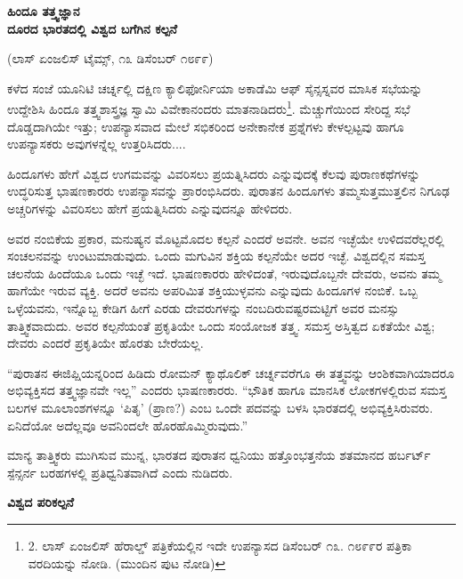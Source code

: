 \begin{center}
\textbf{ಹಿಂದೂ ತತ್ತ್ವಜ್ಞಾನ\\ದೂರದ ಭಾರತದಲ್ಲಿ ವಿಶ್ವದ ಬಗೆಗಿನ ಕಲ್ಪನೆ }
\end{center}

\begin{center}
(ಲಾಸ್ ಏಂಜಲಿಸ್ ಟೈಮ್ಸ್, ೧೩ ಡಿಸೆಂಬರ್ ೧೮೯೯)
\end{center}

ಕಳೆದ ಸಂಜೆ ಯೂನಿಟಿ ಚರ್ಚ್ನಲ್ಲಿ ದಕ್ಷಿಣ ಕ್ಯಾಲಿಫೋರ್ನಿಯಾ ಅಕಾಡೆಮಿ ಆಫ್ ಸೈನ್ಸಸ್ನವರ ಮಾಸಿಕ ಸಭೆಯನ್ನು ಉದ್ದೇಶಿಸಿ ಹಿಂದೂ ತತ್ತ್ವಶಾಸ್ತ್ರಜ್ಞ ಸ್ವಾಮಿ ವಿವೇಕಾನಂದರು ಮಾತನಾಡಿದರು\footnote{2. ಲಾಸ್ ಏಂಜಲಿಸ್ ಹೆರಾಲ್ಡ್ ಪತ್ರಿಕೆಯಲ್ಲಿನ ಇದೇ ಉಪನ್ಯಾಸದ ಡಿಸೆಂಬರ್ ೧೩. ೧೮೯೯ರ ಪತ್ರಿಕಾ ವರದಿಯನ್ನು ನೋಡಿ. (ಮುಂದಿನ ಪುಟ ನೋಡಿ)}. ಮೆಚ್ಚುಗೆಯಿಂದ ಸೇರಿದ್ದ ಸಭೆ ದೊಡ್ಡದಾಗಿಯೇ ಇತ್ತು; ಉಪನ್ಯಾಸವಾದ ಮೇಲೆ ಸಭಿಕರಿಂದ ಅನೇಕಾನೇಕ ಪ್ರಶ್ನೆಗಳು ಕೇಳಲ್ಪಟ್ಟವು ಹಾಗೂ ಉಪನ್ಯಾಸಕರು ಅವುಗಳನ್ನೆಲ್ಲ ಉತ್ತರಿಸಿದರು....

ಹಿಂದೂಗಳು ಹೇಗೆ ವಿಶ್ವದ ಉಗಮವನ್ನು ವಿವರಿಸಲು ಪ್ರಯತ್ನಿಸಿದರು ಎನ್ನುವುದಕ್ಕೆ ಕೆಲವು ಪುರಾಣಕಥೆಗಳನ್ನು ಉದ್ಧರಿಸುತ್ತ ಭಾಷಣಕಾರರು ಉಪನ್ಯಾಸವನ್ನು ಪ್ರಾರಂಭಿಸಿದರು. ಪುರಾತನ ಹಿಂದೂಗಳು ತಮ್ಮಸುತ್ತಮುತ್ತಲಿನ ನಿಗೂಢ ಅಚ್ಚರಿಗಳನ್ನು ವಿವರಿಸಲು ಹೇಗೆ ಪ್ರಯತ್ನಿಸಿದರು ಎನ್ನುವುದನ್ನೂ ಹೇಳಿದರು.

ಅವರ ನಂಬಿಕೆಯ ಪ್ರಕಾರ, ಮನುಷ್ಯನ ಮೊಟ್ಟಮೊದಲ ಕಲ್ಪನೆ ಎಂದರೆ ಅವನೇ. ಅವನ ಇಚ್ಛೆಯೇ ಉಳಿದವರೆಲ್ಲರಲ್ಲಿ ಸಂಚಲನವನ್ನು ಉಂಟುಮಾಡುವುದು. ಒಂದು ಮಗುವಿನ ಶಕ್ತಿಯ ಕಲ್ಪನೆಯೇ ಅದರ ಇಚ್ಛೆ. ವಿಶ್ವದಲ್ಲಿನ ಸಮಸ್ತ ಚಲನೆಯ ಹಿಂದೆಯೂ ಒಂದು ಇಚ್ಛೆ ಇದೆ. ಭಾಷಣಕಾರರು ಹೇಳಿದಂತೆ, ಇರುವುದೊಬ್ಬನೇ ದೇವರು, ಅವನು ತಮ್ಮ ಹಾಗೆಯೇ ಇರುವ ವ್ಯಕ್ತಿ. ಅದರೆ ಅವನು ಅಪರಿಮಿತ ಶಕ್ತಿಯುಳ್ಳವನು ಎನ್ನುವುದು ಹಿಂದೂಗಳ ನಂಬಿಕೆ. ಒಬ್ಬ ಒಳ್ಳೆಯವನು, ಇನ್ನೊಬ್ಬ ಕೇಡಿಗ ಹೀಗೆ ಎರಡು ದೇವರುಗಳನ್ನು ನಂಬದಿರುವಷ್ಟರಮಟ್ಟಿಗೆ ಅವರ ಮನಸ್ಸು ತಾತ್ತ್ವಿಕವಾದುದು. ಅವರ ಕಲ್ಪನೆಯಂತೆ ಪ್ರಕೃತಿಯೇ ಒಂದು ಸಂಯೋಜಕ ತತ್ತ್ವ. ಸಮಸ್ತ ಅಸ್ತಿತ್ವದ ಏಕತೆಯೇ ವಿಶ್ವ; ದೇವರು ಎಂದರೆ ಪ್ರಕೃತಿಯೇ ಹೊರತು ಬೇರೆಯಲ್ಲ.

“ಪುರಾತನ ಈಜಿಪ್ಷಿಯನ್ನರಿಂದ ಹಿಡಿದು ರೋಮನ್ ಕ್ಯಾಥೊಲಿಕ್ ಚರ್ಚ್ನವರೆಗೂ ಈ ತತ್ತ್ವವನ್ನು ಆಂಶಿಕವಾಗಿಯಾದರೂ ಅಭಿವ್ಯಕ್ತಿಸದ ತತ್ತ್ವಜ್ಞಾನವೇ ಇಲ್ಲ” ಎಂದರು ಭಾಷಣಕಾರರು. “ಭೌತಿಕ ಹಾಗೂ ಮಾನಸಿಕ ಲೋಕಗಳಲ್ಲಿರುವ ಸಮಸ್ತ ಬಲಗಳ ಮೂಲಾಂಶಗಳನ್ನೂ ‘ಪಿತೃ’ (ಪ್ರಾಣ?) ಎಂಬ ಒಂದೇ ಪದವನ್ನು ಬಳಸಿ ಭಾರತದಲ್ಲಿ ಅಭಿವ್ಯಕ್ತಿಸಿರುವರು. ಏನಿದೆಯೋ ಅದೆಲ್ಲವೂ ಅವನಿಂದಲೇ ಹೊರಹೊಮ್ಮಿರುವುದು.”

ಮಾನ್ಯ ತಾತ್ತ್ವಿಕರು ಮುಗಿಸುವ ಮುನ್ನ, ಭಾರತದ ಪುರಾತನ ಧ್ವನಿಯು ಹತ್ತೊಂಭತ್ತನೆಯ ಶತಮಾನದ ಹರ್ಬರ್ಟ್ ಸ್ಪೆನ್ಸರ್ನ ಬರಹಗಳಲ್ಲಿ ಪ್ರತಿಧ್ವನಿತವಾಗಿದೆ ಎಂದು ನುಡಿದರು.

\begin{center}
\textbf{ವಿಶ್ವದ ಪರಿಕಲ್ಪನೆ}
\end{center}

